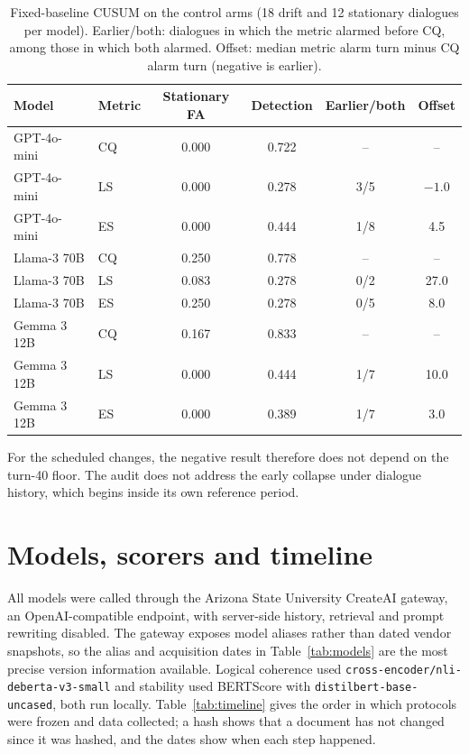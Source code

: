 \documentclass[10pt]{article}
\begin{document}
\begin{table}[h]\centering\small
\caption{Fixed-baseline CUSUM on the control arms (18 drift and 12 stationary
dialogues per model). Earlier/both: dialogues in which the metric alarmed
before CQ, among those in which both alarmed. Offset: median metric alarm turn
minus CQ alarm turn (negative is earlier).}
\label{tab:forensic-emp}
\begin{tabular}{llcccc}\toprule
Model & Metric & Stationary FA & Detection & Earlier/both & Offset\\\midrule
GPT-4o-mini & CQ & 0.000 & 0.722 & -- & --\\
GPT-4o-mini & LS & 0.000 & 0.278 & 3/5 & $-1.0$\\
GPT-4o-mini & ES & 0.000 & 0.444 & 1/8 & 4.5\\
Llama-3 70B & CQ & 0.250 & 0.778 & -- & --\\
Llama-3 70B & LS & 0.083 & 0.278 & 0/2 & 27.0\\
Llama-3 70B & ES & 0.250 & 0.278 & 0/5 & 8.0\\
Gemma 3 12B & CQ & 0.167 & 0.833 & -- & --\\
Gemma 3 12B & LS & 0.000 & 0.444 & 1/7 & 10.0\\
Gemma 3 12B & ES & 0.000 & 0.389 & 1/7 & 3.0\\
\bottomrule\end{tabular}\end{table}

For the scheduled changes, the negative result therefore does not depend on
the turn-40 floor. The audit does not address the early collapse under
dialogue history, which begins inside its own reference period.

\section{Models, scorers and timeline}
\label{sec:timeline}
All models were called through the Arizona State University CreateAI gateway,
an OpenAI-compatible endpoint, with server-side history, retrieval and prompt
rewriting disabled. The gateway exposes model aliases rather than dated vendor
snapshots, so the alias and acquisition dates in Table~\ref{tab:models} are the
most precise version information available. Logical coherence used
\texttt{cross-encoder/nli-deberta-v3-small} and stability used BERTScore with
\texttt{distilbert-base-uncased}, both run locally. Table~\ref{tab:timeline}
gives the order in which protocols were frozen and data collected; a hash shows
that a document has not changed since it was hashed, and the dates show when
each step happened.
\end{document}
